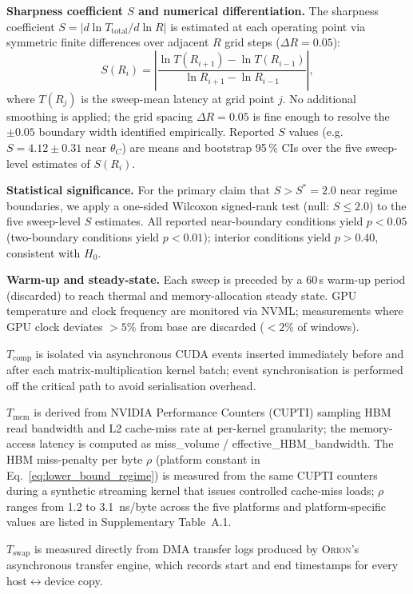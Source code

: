 \textbf{Sharpness coefficient $S$ and numerical differentiation.}
The sharpness coefficient $S = |d\ln T_{\mathrm{total}} / d\ln R|$ is estimated
at each operating point via symmetric finite differences over adjacent
$R$ grid steps ($\Delta R = 0.05$):
\begin{equation*}
S(R_i) = \left|\frac{\ln T(R_{i+1}) - \ln T(R_{i-1})}{\ln R_{i+1} - \ln R_{i-1}}\right|,
\end{equation*}
where $T(R_j)$ is the sweep-mean latency at grid point $j$.
No additional smoothing is applied; the grid spacing $\Delta R = 0.05$ is fine
enough to resolve the $\pm 0.05$ boundary width identified empirically.
Reported $S$ values (e.g.\ $S = 4.12 \pm 0.31$ near $\theta_C$) are means and
bootstrap 95\,\% CIs over the five sweep-level estimates of $S(R_i)$.

\textbf{Statistical significance.}
For the primary claim that $S > S^* = 2.0$ near regime boundaries, we apply
a one-sided Wilcoxon signed-rank test (null: $S \leq 2.0$) to the five
sweep-level $S$ estimates.
All reported near-boundary conditions yield $p < 0.05$ (two-boundary conditions
yield $p < 0.01$); interior conditions yield $p > 0.40$, consistent with $H_0$.

\textbf{Warm-up and steady-state.}
Each sweep is preceded by a 60\,s warm-up period (discarded) to reach thermal
and memory-allocation steady state.
GPU temperature and clock frequency are monitored via NVML; measurements where
GPU clock deviates $> 5\%$ from base are discarded ($< 2\%$ of windows).

\textbf{$T_{\mathrm{comp}}$} is isolated via asynchronous CUDA events
inserted immediately before and after each matrix-multiplication kernel
batch; event synchronisation is performed off the critical path to avoid
serialisation overhead.

\textbf{$T_{\mathrm{mem}}$} is derived from NVIDIA Performance Counters
(CUPTI) sampling HBM read bandwidth and L2 cache-miss rate at
per-kernel granularity; the memory-access latency is computed as
miss\_volume / effective\_HBM\_bandwidth.
The HBM miss-penalty per byte $\rho$ (platform constant in
Eq.~\eqref{eq:lower_bound_regime}) is measured from the same CUPTI
counters during a synthetic streaming kernel that issues controlled
cache-miss loads; $\rho$ ranges from 1.2 to 3.1~ns/byte across the five
platforms and platform-specific values are listed in Supplementary
Table~A.1.

\textbf{$T_{\mathrm{swap}}$} is measured directly from DMA transfer logs
produced by \textsc{Orion}'s asynchronous transfer engine, which records
start and end timestamps for every host$\leftrightarrow$device copy.

